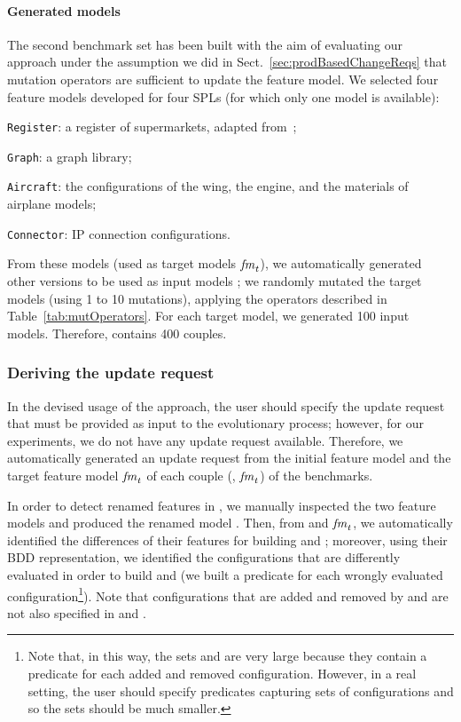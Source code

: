 \begin{tikzborder}{\cite{Gargantini16:validation}}
\begin{tikzborder}{\cite{gargantini_combinatorial_2017}}
\begin{tikzborder}{\cite{garn2019}}
\begin{tikzborder}{\cite{arcaini2019achieving}}
	\paragraph{Generated models}
	\bb The second benchmark set \benchMut has been built with the aim of evaluating our approach under the assumption we did in Sect.~\ref{sec:prodBasedChangeReqs} that mutation operators are sufficient to update the feature model. We selected four feature models developed for four SPLs (for which only one model is available):
	\begin{compactitem}
		\item {\tt Register}: a register of supermarkets, adapted from~\cite{Shimbara2015};
		\item {\tt Graph}: a graph library;
		\item {\tt Aircraft}: the configurations of the wing, the engine, and the materials of airplane models;
		\item {\tt Connector}: IP connection configurations.
	\end{compactitem}
	From these models (used as target models $\mathit{fm}_t$), we automatically generated other versions to be used as input models \initFm; we randomly mutated the target models (using 1 to 10 mutations), applying the operators described in Table~\ref{tab:mutOperators}. For each target model, we generated 100 input models. Therefore, \benchMut contains 400 couples.\be
	
	\subsubsection{Deriving the update request}
	
	\bb In the devised usage of the approach, the user should specify the update request that must be provided as input to the evolutionary process; however, for our experiments, we do not have any update request available. Therefore, we automatically generated an update request \UR from the initial feature model \initFm and the target feature model $\mathit{fm}_t$ of each couple (\initFm, $\mathit{fm}_t$) of the benchmarks.
	
	In order to detect renamed features in \Ftbr, we manually inspected the two feature models and produced the renamed model \fmrenamed. Then, from \fmrenamed and $\mathit{fm}_t$, we automatically identified the differences of their features for building \Fadd and \Frem; moreover, using their BDD representation, we identified the configurations that are differently evaluated in order to build \CFrelax and \CFrem (we built a predicate for each wrongly evaluated configuration\footnote{Note that, in this way, the sets \CFrelax and \CFrem are very large because they contain a predicate for each added and removed configuration. However, in a real setting, the user should specify predicates capturing sets of configurations and so the sets should be much smaller.}). Note that configurations that are added and removed by \Fadd and \Frem are not also specified in \CFrelax and \CFrem.
	

\end{tikzborder}
\end{tikzborder}
\end{tikzborder}
\end{tikzborder}
